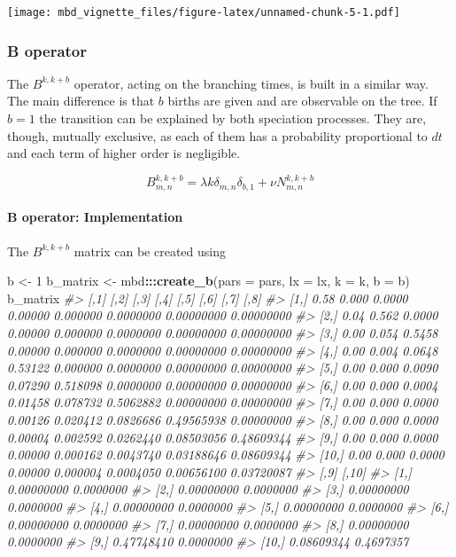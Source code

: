 \documentclass[]{article}
\newenvironment{Shaded}{\begin{snugshade}}{\end{snugshade}}
\newcommand{\CommentTok}[1]{\textcolor[rgb]{0.56,0.35,0.01}{\textit{#1}}}
\newcommand{\DataTypeTok}[1]{\textcolor[rgb]{0.13,0.29,0.53}{#1}}
\newcommand{\DecValTok}[1]{\textcolor[rgb]{0.00,0.00,0.81}{#1}}
\newcommand{\KeywordTok}[1]{\textcolor[rgb]{0.13,0.29,0.53}{\textbf{#1}}}
\newcommand{\NormalTok}[1]{#1}
\newcommand{\OperatorTok}[1]{\textcolor[rgb]{0.81,0.36,0.00}{\textbf{#1}}}
\newcommand{\StringTok}[1]{\textcolor[rgb]{0.31,0.60,0.02}{#1}}
\let\oldparagraph\paragraph
\renewcommand{\paragraph}[1]{\oldparagraph{#1}\mbox{}}
\begin{document}
\texttt{[image: mbd\_vignette\_files/figure-latex/unnamed-chunk-5-1.pdf]}

\hypertarget{b-operator}{%
\subsubsection{B operator}\label{b-operator}}

The \(B^{k, k + b}\) operator, acting on the branching times, is built in a similar way.
The main difference is that \(b\) births are given and are observable on the tree.
If \(b = 1\) the transition can be explained by both speciation processes. They
are, though, mutually exclusive, as each of them has a probability proportional
to \(dt\) and each term of higher order is negligible.

\[
B^{k,k + b}_{m,n} = \lambda k \delta_{m,n} \delta_{b,1} + \nu N^{k,k + b}_{m,n}
\]

\hypertarget{b-operator-implementation}{%
\paragraph{B operator: Implementation}\label{b-operator-implementation}}

The \(B^{k, k + b}\) matrix can be created using

\begin{Shaded}
\begin{Highlighting}[]
\NormalTok{b <-}\StringTok{ }\DecValTok{1}
\NormalTok{b_matrix <-}\StringTok{ }\NormalTok{mbd}\OperatorTok{:::}\KeywordTok{create_b}\NormalTok{(}\DataTypeTok{pars =}\NormalTok{ pars, }\DataTypeTok{lx =}\NormalTok{ lx, }\DataTypeTok{k =}\NormalTok{ k, }\DataTypeTok{b =}\NormalTok{ b)}
\NormalTok{b_matrix}
\CommentTok{#>       [,1]  [,2]   [,3]    [,4]     [,5]      [,6]       [,7]       [,8]}
\CommentTok{#>  [1,] 0.58 0.000 0.0000 0.00000 0.000000 0.0000000 0.00000000 0.00000000}
\CommentTok{#>  [2,] 0.04 0.562 0.0000 0.00000 0.000000 0.0000000 0.00000000 0.00000000}
\CommentTok{#>  [3,] 0.00 0.054 0.5458 0.00000 0.000000 0.0000000 0.00000000 0.00000000}
\CommentTok{#>  [4,] 0.00 0.004 0.0648 0.53122 0.000000 0.0000000 0.00000000 0.00000000}
\CommentTok{#>  [5,] 0.00 0.000 0.0090 0.07290 0.518098 0.0000000 0.00000000 0.00000000}
\CommentTok{#>  [6,] 0.00 0.000 0.0004 0.01458 0.078732 0.5062882 0.00000000 0.00000000}
\CommentTok{#>  [7,] 0.00 0.000 0.0000 0.00126 0.020412 0.0826686 0.49565938 0.00000000}
\CommentTok{#>  [8,] 0.00 0.000 0.0000 0.00004 0.002592 0.0262440 0.08503056 0.48609344}
\CommentTok{#>  [9,] 0.00 0.000 0.0000 0.00000 0.000162 0.0043740 0.03188646 0.08609344}
\CommentTok{#> [10,] 0.00 0.000 0.0000 0.00000 0.000004 0.0004050 0.00656100 0.03720087}
\CommentTok{#>             [,9]     [,10]}
\CommentTok{#>  [1,] 0.00000000 0.0000000}
\CommentTok{#>  [2,] 0.00000000 0.0000000}
\CommentTok{#>  [3,] 0.00000000 0.0000000}
\CommentTok{#>  [4,] 0.00000000 0.0000000}
\CommentTok{#>  [5,] 0.00000000 0.0000000}
\CommentTok{#>  [6,] 0.00000000 0.0000000}
\CommentTok{#>  [7,] 0.00000000 0.0000000}
\CommentTok{#>  [8,] 0.00000000 0.0000000}
\CommentTok{#>  [9,] 0.47748410 0.0000000}
\CommentTok{#> [10,] 0.08609344 0.4697357}
\end{Highlighting}
\end{Shaded}
\end{document}
